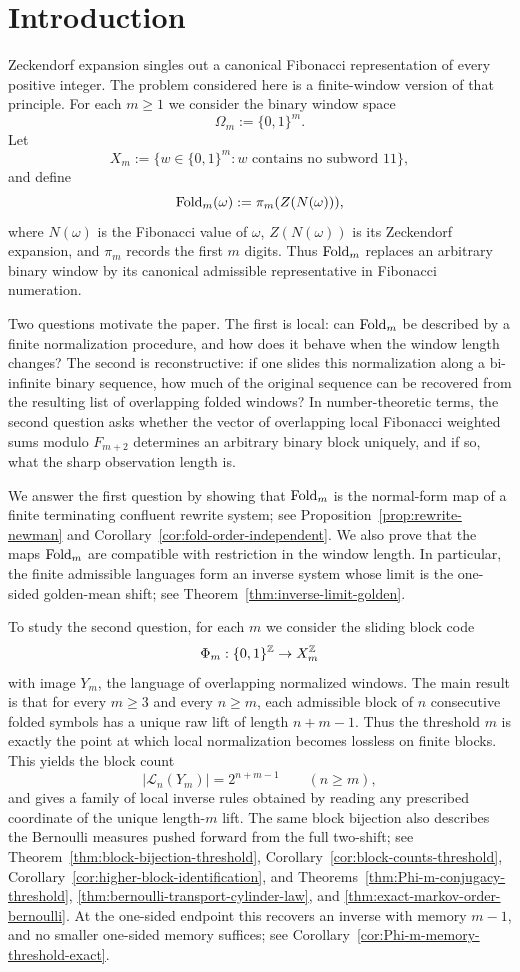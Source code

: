 \section{Introduction}

Zeckendorf expansion singles out a canonical Fibonacci representation of every
positive integer.  The problem considered here is a finite-window version of
that principle.  For each $m\ge 1$ we consider the binary window space
\[
\Omega_m:=\{0,1\}^m.
\]
Let
\[
X_m:=\{w\in\{0,1\}^m:\text{$w$ contains no subword }11\},
\]
and define
\[
\operatorname{Fold}_m(\omega):=\pi_m(Z(N(\omega))),
\]
where $N(\omega)$ is the Fibonacci value of $\omega$, $Z(N(\omega))$ is its
Zeckendorf expansion, and $\pi_m$ records the first $m$ digits.  Thus
$\operatorname{Fold}_m$ replaces an arbitrary binary window by its canonical admissible
representative in Fibonacci numeration.

Two questions motivate the paper.  The first is local: can $\operatorname{Fold}_m$ be
described by a finite normalization procedure, and how does it behave when the
window length changes?  The second is reconstructive: if one slides this
normalization along a bi-infinite binary sequence, how much of the original
sequence can be recovered from the resulting list of overlapping folded
windows?  In number-theoretic terms, the second question asks whether the
vector of overlapping local Fibonacci weighted sums modulo $F_{m+2}$
determines an arbitrary binary block uniquely, and if so, what the sharp
observation length is.

We answer the first question by showing that $\operatorname{Fold}_m$ is the normal-form map
of a finite terminating confluent rewrite system; see
Proposition~\ref{prop:rewrite-newman} and
Corollary~\ref{cor:fold-order-independent}.  We also prove that the maps
$\operatorname{Fold}_m$ are compatible with restriction in the window length.  In particular,
the finite admissible languages form an inverse system whose limit is the
one-sided golden-mean shift; see Theorem~\ref{thm:inverse-limit-golden}.

To study the second question, for each $m$ we consider the sliding block code
\[
\Phi_m:\{0,1\}^{\mathbb{Z}}\to X_m^{\mathbb{Z}}
\]
with image $Y_m$, the language of overlapping normalized windows.  The main
result is that for every $m\ge 3$ and every $n\ge m$, each admissible block of
$n$ consecutive folded symbols has a unique raw lift of length $n+m-1$.  Thus
the threshold $m$ is exactly the point at which local normalization becomes
lossless on finite blocks.  This yields the block count
\[
\lvert\mathcal L_n(Y_m)\rvert=2^{n+m-1}
\qquad (n\ge m),
\]
and gives a family of local inverse rules obtained by reading any prescribed
coordinate of the unique length-$m$ lift.  The same block bijection also
describes the Bernoulli measures pushed forward from the full two-shift; see
Theorem~\ref{thm:block-bijection-threshold},
Corollary~\ref{cor:block-counts-threshold},
Corollary~\ref{cor:higher-block-identification}, and
Theorems~\ref{thm:Phi-m-conjugacy-threshold},
\ref{thm:bernoulli-transport-cylinder-law}, and
\ref{thm:exact-markov-order-bernoulli}.  At the one-sided endpoint this
recovers an inverse with memory $m-1$, and no smaller one-sided memory
suffices; see Corollary~\ref{cor:Phi-m-memory-threshold-exact}.

